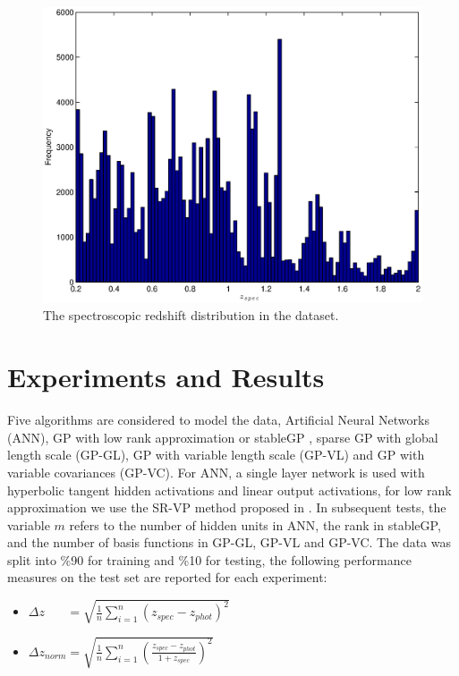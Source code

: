 \documentclass[useAMS,usenatbib,fleqn]{mn2e}
\begin{document}
\begin{figure}
       \centering
       \includegraphics[width=\columnwidth]{figures/zspec.eps}
        \caption{The spectroscopic redshift distribution in the dataset.} 
       \label{fig-zspec-hostogram}
\end{figure}

\section{Experiments and Results}
\label{sec-experiments}

Five algorithms are considered to model the data, Artificial Neural Networks (ANN), GP with low rank approximation or stableGP , sparse GP with global length scale (GP-GL), GP with variable length scale (GP-VL) and  GP with variable covariances (GP-VC). For ANN, a single layer network is used with hyperbolic tangent hidden activations and linear output activations, for low rank approximation we use the SR-VP method proposed in \citep{foster2009}. In subsequent tests, the variable $m$ refers to the number of hidden units in ANN, the rank in stableGP, and the number of basis functions in GP-GL, GP-VL and GP-VC. The data was split into \%90 for training and \%10 for testing, the following performance measures on the test set are reported for each experiment:

\begin{itemize}
  \item $\Delta z_{\phantom{norm}} = \sqrt{\frac{1}{n}\sum_{i=1}^{n}\left(z_{spec}-z_{phot}\right)^{2}}$
  \item $\Delta z_{norm} = \sqrt{\frac{1}{n}\sum_{i=1}^{n}\left(\frac{z_{spec}-z_{phot}}{1+z_{spec}}\right)^{2}}$
\end{itemize}
\end{document}
